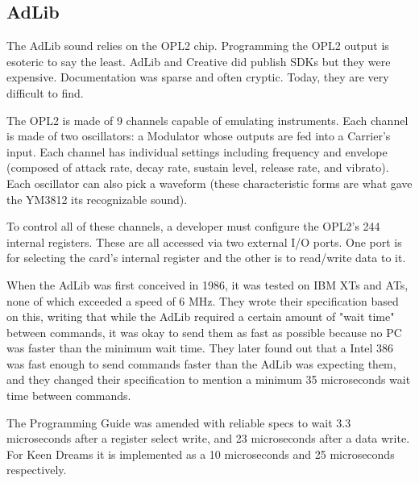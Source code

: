 \documentclass[book.tex]{subfiles}
\begin{document}
\subsection{AdLib}
The AdLib sound relies on the OPL2 chip. Programming the OPL2 output is esoteric to say the least. AdLib and Creative did publish SDKs but they were expensive.  Documentation was sparse and often cryptic. Today, they are very difficult to find.\\
\par
The OPL2 is made of 9 channels capable of emulating instruments. Each channel is made of two oscillators: a Modulator whose outputs are fed into a Carrier's input. Each channel has individual settings including frequency and envelope (composed of attack rate, decay rate, sustain level, release rate, and vibrato). Each oscillator can also pick a waveform (these characteristic forms are what gave the YM3812 its recognizable sound).\\
\par
 To control all of these channels, a developer must configure the OPL2's 244 internal registers. These are all accessed via two external I/O ports. One port is for selecting the card's internal register and the other is to read/write data to it.\\
\par
\begin{minipage}{\textwidth}

\end{minipage}
\par
When the AdLib was first conceived in 1986, it was tested on IBM XTs and ATs, none of which exceeded a speed of 6 MHz. They wrote their specification based on this, writing that while the AdLib required a certain amount of "wait time" between commands, it was okay to send them as fast as possible because no PC was faster than the minimum wait time. They later found out that a Intel 386 was fast enough to send commands faster than the AdLib was expecting them, and they changed their specification to mention a minimum 35 microseconds wait time between commands.\\

\par
The Programming Guide was amended with reliable specs to wait 3.3 microseconds after a register select write, and 23 microseconds after a data write. For Keen Dreams it is implemented as a 10 microseconds and 25 microseconds respectively.
\par
\begin{minipage}{\textwidth}

\end{minipage}
\par
\end{document}
